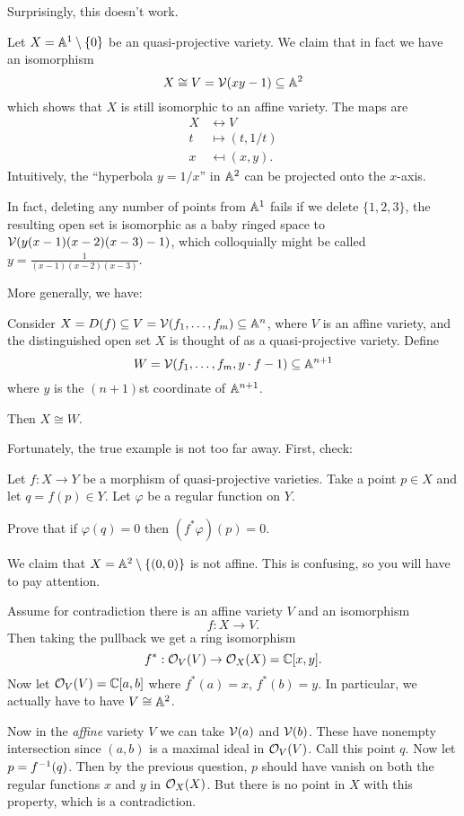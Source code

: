 Surprisingly, this doesn't work.
\begin{example}
	Let $X = \mathbb A^1 \setminus \{0\}$ be an quasi-projective variety.
	We claim that in fact we have an isomorphism
	\[ X \cong V = \mathcal V(xy-1) \subseteq \mathbb A^2 \]
	which shows that $X$ is still isomorphic to an affine variety.
	The maps are
	\begin{align*}
		X & \leftrightarrow V \\
		t &\mapsto (t, 1/t) \\
		x &\mapsfrom (x, y).
	\end{align*}
	Intuitively, the ``hyperbola $y=1/x$'' in $\mathbb A^2$ can be projected
	onto the $x$-axis.
\end{example}
In fact, deleting any number of points from $\mathbb A^1$ fails
if we delete $\{1,2,3\}$, the resulting open set
is isomorphic as a baby ringed space to $\mathcal V(y(x-1)(x-2)(x-3)-1)$,
which colloquially might be called $y = \frac{1}{(x-1)(x-2)(x-3)}$.

More generally, we have:
\begin{theorem}
	Consider $X = D(f) \subseteq V = \mathcal V(f_1, \dots, f_m) \subseteq \mathbb A^n$,
	where $V$ is an affine variety,
	and the distinguished open set $X$ is thought of as
	a quasi-projective variety.
	Define
	\[ W = \mathcal V(f_1, \dots, f_m, y \cdot f-1) \subseteq \mathbb A^{n+1} \]
	where $y$ is the $(n+1)$st coordinate of $\mathbb A^{n+1}$.

	Then $X \cong W$.
\end{theorem}

Fortunately, the true example is not too far away.
First, check:
\begin{ques}
	Let $f : X \to Y$ be a morphism of quasi-projective varieties.
	Take a point $p \in X$ and let $q = f(p) \in Y$.
	Let $\varphi$ be a regular function on $Y$.

	Prove that if $\varphi(q) = 0$ then $(f^\ast\varphi)(p) = 0$.
\end{ques}
\begin{example}
	We claim that $X = \mathbb A^2 \setminus \{ (0,0) \}$ is not affine.
	This is confusing, so you will have to pay attention.

	Assume for contradiction there is an affine variety $V$
	and an isomorphism
	\[ f : X \to V. \]
	Then taking the pullback we get a ring isomorphism
	\[ f^\ast : \mathcal O_V(V) \to \mathcal O_X(X) = \mathbb C[x,y]. \]
	Now let $\mathcal O_V(V) = \mathbb C[a,b]$ where $f^\ast(a) = x$, $f^\ast(b) = y$.
	In particular, we actually have to have $V \cong \mathbb A^2$.

	Now in the \emph{affine} variety $V$ we can take $\mathcal V(a)$ and $\mathcal V(b)$.
	These have nonempty intersection since $(a,b)$
	is a maximal ideal in $\mathcal O_V(V)$.
	Call this point $q$.  Now let $p = f^{-1}(q)$.
	Then by the previous question, $p$ should have vanish
	on both the regular functions $x$ and $y$ in $\mathcal O_X(X)$.
	But there is no point in $X$ with this property, which is a contradiction.
\end{example}

